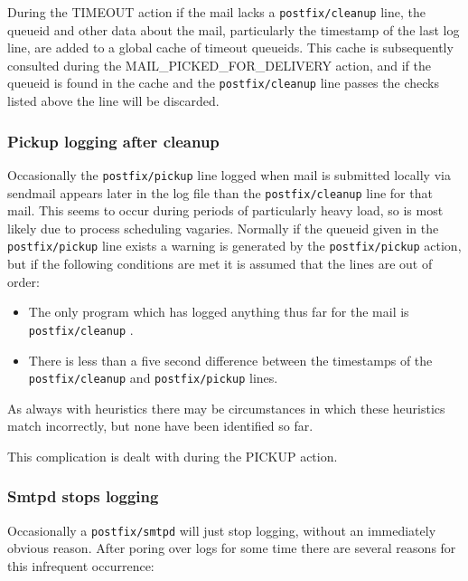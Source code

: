 \documentclass[a4paper,12pt,draft]{article}
\newcommand{\daemon}[1]{%
    \texttt{postfix/#1}%
}
\begin{document}
During the TIMEOUT action if the mail lacks a \daemon{cleanup} line, the
queueid and other data about the mail, particularly the timestamp of the
last log line, are added to a global cache of timeout queueids.  This cache
is subsequently consulted during the MAIL\_PICKED\_FOR\_DELIVERY action,
and if the queueid is found in the cache and the \daemon{cleanup} line
passes the checks listed above the line will be discarded.

\subsubsection{Pickup logging after cleanup}

\label{pickup logging after cleanup}

Occasionally the \daemon{pickup} line logged when mail is submitted locally
via sendmail appears later in the log file than the \daemon{cleanup} line
for that mail.  This seems to occur during periods of particularly heavy
load, so is most likely due to process scheduling vagaries.  Normally if
the queueid given in the \daemon{pickup} line exists a warning is generated
by the \daemon{pickup} action, but if the following conditions are met it
is assumed that the lines are out of order:

\begin{itemize}

    \item The only program which has logged anything thus far for the mail
        is \daemon{cleanup}.

    \item There is less than a five second difference between the
        timestamps of the \daemon{cleanup} and \daemon{pickup} lines.

\end{itemize}

As always with heuristics there may be circumstances in which these
heuristics match incorrectly,  but none have been identified so far.

This complication is dealt with during the PICKUP action.

\subsubsection{Smtpd stops logging}

\label{smtpd stops logging}

Occasionally a \daemon{smtpd} will just stop logging, without an
immediately obvious reason.  After poring over logs for some time there are
several reasons for this infrequent occurrence:
\end{document}

